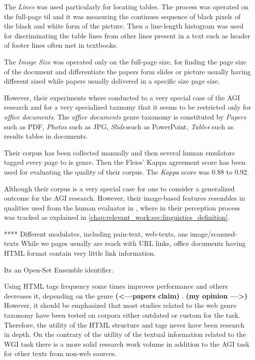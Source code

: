 The \textit{Lines} was used particularly for locating tables. The process was operated on the full-page til and it was measuring the continues sequence of black pixels of the black and white form of the picture. Then a line-length histogram was used for discriminating the table lines from other lines present in a text such as header of footer lines often met in textbooks.

The \textit{Image Size} was operated only on the full-page size, for finding the page size of the document and differentiate the papers form slides or picture usually having different sized while papers usually delivered in a specific size page size.

However, their experiments where conducted to a very special case of  the AGI research and for a very specialized taxnomy that it seems to be restricted only for \textit{office documents}. The \textit{office documents} genre taxonomy is constituted by \textit{Papers} such as PDF, \textit{Photos} such as JPG, \textit{Slides}such as PowerPoint, \textit{Tables} such as results tables in documents. 

Their corpus has been collected manually and then several human emulators tagged every page to is genre. Then the Fleiss' Kappa agreement score has been used for evaluating the quality of their corpus. The \textit{Kappa} score was 0.88 to 0.92.

Although their corpus is a very special case for one to consider a generalized outcome for the AGI research. However, their image-based features resembles in qualities used from the human evaluator in \parencite{clark2014you}, where in their perception process was tracked as explained in \ref{chap:relevant_work:sec:linguistics_definition}. 

****
Different modulates, including pain-text, web-texts, ans image/scanned-texts
While we pages usually are reach with URL links, office documents having HTML format contain very little link information. 

Its an Open-Set Ensemble identifier. 

Using HTML tags frequency some times improves performance and others decreases it, depending on the genre\textbf{ (<---papers claim) }.  \textbf{(my opinion --->)} However, it should be emphasized that most studies related to the web genre taxonomy have been tested on corpora either outdated or custom for the task. Therefore, the utility of the HTML structure and tags never have been research in depth. On the contrary of the utility of the textual information related to the WGI task there is a more solid research work volume in addition to the AGI task for other texts from non-web sources.

